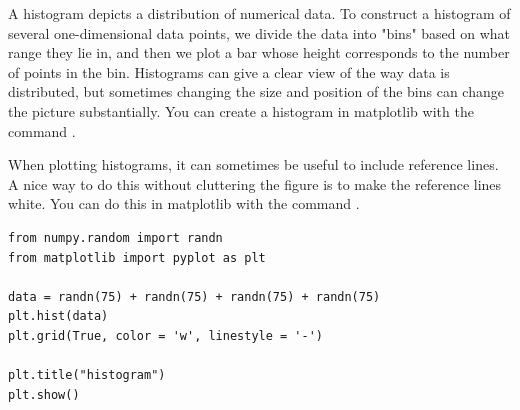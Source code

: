 A histogram depicts a distribution of numerical data.  To construct a histogram of several one-dimensional data points, we divide the data into "bins" based on what range they lie in, and then we plot a bar whose height corresponds to the number of points in the bin.  Histograms can give a clear view of the way data is distributed, but sometimes changing the size and position of the bins can change the picture substantially.  You can create a histogram in matplotlib with the command . 

When plotting histograms, it can sometimes be useful to include reference lines.  A nice way to do this without cluttering the figure is to make the reference lines white.  You can do this in matplotlib with the command .




\begin{lstlisting}
from numpy.random import randn
from matplotlib import pyplot as plt

data = randn(75) + randn(75) + randn(75) + randn(75)
plt.hist(data)
plt.grid(True, color = 'w', linestyle = '-')

plt.title("histogram")
plt.show()

\end{lstlisting}

